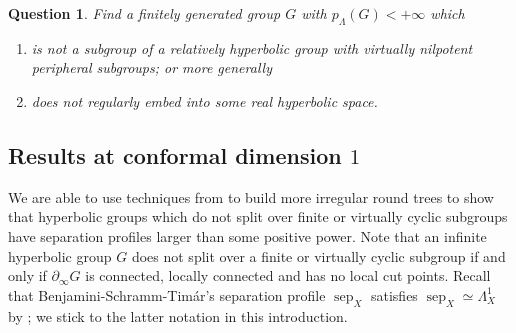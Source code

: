 \documentclass[11pt]{amsart}
\numberwithin{equation}{section}
\newtheorem{question}[equation]{Question}
\theoremstyle{citing}
\DeclareMathOperator{\sep}{sep}
\newcommand{\bdry}{\partial_\infty}
\newcommand{\pcrit}{p_{\Lambda}}
\numberwithin{equation}{section}
\begin{document}
\begin{question} Find a finitely generated group $G$ with $\pcrit(G)<+\infty$ which 
\begin{enumerate}
    \item[(i)] is not a subgroup of a relatively hyperbolic group with virtually nilpotent peripheral subgroups; or more generally
    \item[(ii)] does not regularly embed into some real hyperbolic space.
\end{enumerate}
\end{question}



\subsection{Results at conformal dimension $1$}
We are able to use techniques from \cite{Mac-10-confdim} to build more irregular round trees to show that hyperbolic groups which do not split over finite or virtually cyclic subgroups have separation profiles larger than some positive power.  Note that an infinite hyperbolic group $G$ does not split over a finite or virtually cyclic subgroup if and only if $\bdry G$ is connected, locally connected and has no local cut points. Recall that Benjamini-Schramm-Tim\'ar's separation profile $\sep_X$ satisfies $\sep_X \simeq \Lambda_X^1$ by \cite{HumeMackTess-Pprof}; we stick to the latter notation in this introduction.
\end{document}
